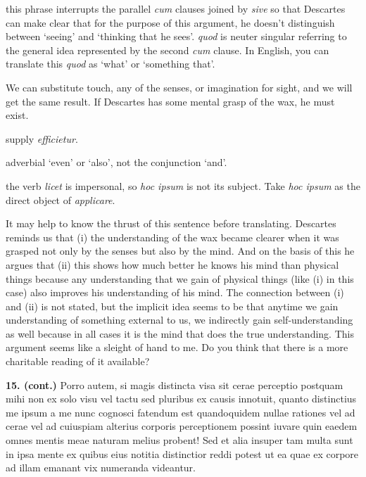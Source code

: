  this phrase interrupts the parallel \textit{cum} clauses joined by \textit{sive} so that Descartes can make clear that for the purpose of this argument, he doesn't distinguish between `seeing' and `thinking that he sees'. \textit{quod} is neuter singular referring to the general idea represented by the second \textit{cum} clause. In English, you can translate this \textit{quod} as `what' or `something that'.

 We can substitute touch, any of the senses, or imagination for sight, and we will get the same result. If Descartes has some mental grasp  of the wax, he must exist.

 supply \textit{efficietur}.

 adverbial `even' or `also', not the conjunction `and'.

 the verb \textit{licet} is impersonal, so \textit{hoc ipsum} is not its subject. Take \textit{hoc ipsum} as the direct object of \textit{applicare}.

 It may help to know the thrust of this sentence before translating. Descartes reminds us that (i) the understanding of the wax became clearer when it was grasped not only by the senses but also by the mind. And on the basis of this he argues that (ii) this shows how much better he knows his mind than physical things because any understanding that we gain of physical things (like (i) in this case) also improves his understanding of his mind. The connection between (i) and (ii) is not stated, but the implicit idea seems to be that anytime we gain understanding of something external to us, we indirectly gain self-understanding as well because in all cases it is the mind that does the true understanding. This argument seems like a sleight of hand to me. Do you think that there is a more charitable reading of it available?

\clearpage

\beginnumbering
{}
\pstart
\begin{latin}
    \textenglish{\textbf{15. (cont.)}} Porro autem, si magis distincta visa sit cerae perceptio postquam mihi non ex solo visu vel tactu sed pluribus ex causis innotuit, quanto distinctius me ipsum a me nunc cognosci fatendum est quandoquidem nullae rationes vel ad cerae vel ad cuiuspiam alterius corporis perceptionem possint iuvare quin eaedem omnes mentis meae naturam melius probent! Sed et alia insuper tam multa sunt in ipsa mente ex quibus eius notitia distinctior reddi potest ut ea quae ex corpore ad illam emanant vix numeranda videantur.
\end{latin}
\pend
\endnumbering

